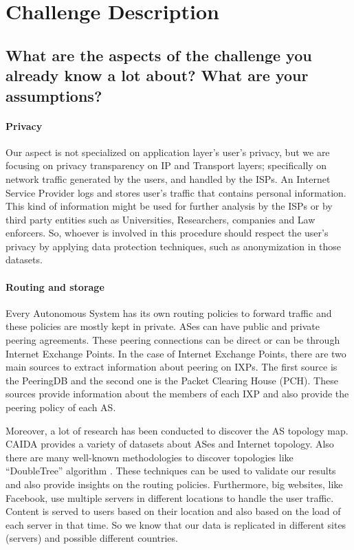 \section{Challenge Description}
\label{sec_a}

\subsection{What are the aspects of the challenge you already know a lot about?
What are your assumptions?}

\paragraph{Privacy\\}

Our aspect is not specialized  on application layer's  user's privacy,  
but we are focusing on privacy transparency on IP and Transport layers; 
specifically on  network traffic generated by the users, and  handled by the ISPs.
An Internet Service Provider logs and stores user's traffic that contains 
personal information. 
This kind of information might be used for further analysis by the ISPs or by 
third party entities such as Universities, Researchers, companies and Law enforcers.	
So, whoever is involved in this procedure should respect the user's privacy by 
applying data protection techniques, such as anonymization in those datasets.

\paragraph{Routing and storage\\}

Every Autonomous System has its own routing policies to forward traffic and these 
policies are mostly kept in private. ASes can have public and private peering 
agreements. These peering connections can be direct or can be through Internet 
Exchange Points. In the case of Internet Exchange Points, there are two main 
sources to extract information about peering on IXPs. The first source is the 
PeeringDB and the second one is the Packet Clearing House (PCH). 
These sources provide information about the members of each IXP and also provide
the peering policy of each AS. 

Moreover, a lot of research has been conducted to discover the AS topology map. 
CAIDA provides a variety of datasets about ASes and Internet topology. Also there 
are many well-known methodologies to discover topologies like ``DoubleTree'' algorithm 
\cite{caida}. 
These techniques can be used  to validate our results and also provide insights 
on the routing policies.
Furthermore, big websites, like Facebook, use multiple servers in different locations 
to handle the user traffic. Content is served to users based on their location and 
also based on the load of each server in that time. So we know that our data is 
replicated in different sites (servers) and possible different countries. 

